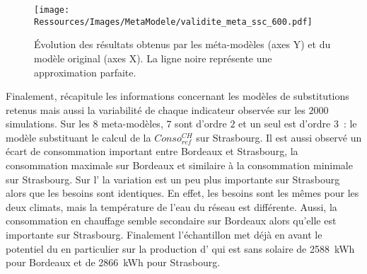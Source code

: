 \begin{figure}
    \centering
    \texttt{[image: Ressources/Images/MetaModele/validite\_meta\_ssc\_600.pdf]}
    \caption[Évaluation de la précision des méta-modèles pour les solutions de l’échantillon]
            {Évolution des résultats obtenus par les méta-modèles (axes Y) et du modèle
             original (axes X). La ligne noire représente une approximation parfaite.}
    \label{fig:validite_meta_ssc}
\end{figure}

Finalement,  récapitule les informations concernant les modèles
de substitutions retenus mais aussi la variabilité de chaque indicateur observée sur les
$2000$ simulations. Sur les $8$ meta-modèles, $7$ sont d’ordre $2$ et un seul est d’ordre
$3$~: le modèle substituant le calcul de la $Conso_{ref}^{CH}$ sur Strasbourg. Il est
aussi observé un écart de consommation important entre Bordeaux et Strasbourg, la
consommation maximale sur Bordeaux et similaire à la consommation minimale sur Strasbourg.
Sur l’ la variation est un peu plus importante sur Strasbourg alors que les
besoins sont identiques. En effet, les besoins sont les mêmes pour les deux climats, mais
la température de l’eau du réseau est différente. Aussi, la consommation
en chauffage semble secondaire sur Bordeaux alors qu’elle est importante sur Strasbourg.
Finalement l’échantillon met déjà en avant le potentiel du  en particulier sur
la production d’ qui est sans solaire de \SI{2588}{kWh} pour Bordeaux
et de \SI{2866}{kWh} pour Strasbourg.

